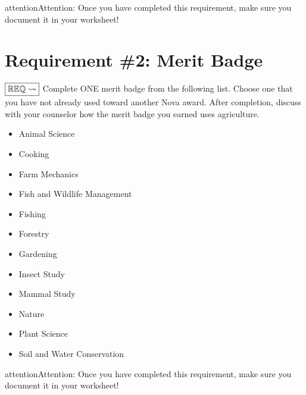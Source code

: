\documentclass[letterpaper,10pt,english,openany,oneside]{sphinxmanual}
\let\sphinxpxdimen\pdfpxdimen\else\newdimen\sphinxpxdimen
\begin{document}
\begin{sphinxadmonition}{attention}{Attention:}
Once you have completed this requirement, make sure you document it in your worksheet!
\end{sphinxadmonition}


\chapter{Requirement \#2: Merit Badge}
\label{\detokenize{requirement2:requirement-2-merit-badge}}\label{\detokenize{requirement2::doc}}
\(\boxed{\mathbb{REQ}\Large \rightsquigarrow}\) Complete ONE merit badge from the following list. Choose one that you have not already used toward another Nova award.
After completion, discuss with your counselor how the merit badge you earned uses agriculture.
\begin{itemize}
\item {} 
Animal Science

\item {} 
Cooking

\item {} 
Farm Mechanics

\item {} 
Fish and Wildlife Management

\item {} 
Fishing

\item {} 
Forestry

\item {} 
Gardening

\item {} 
Insect Study

\item {} 
Mammal Study

\item {} 
Nature

\item {} 
Plant Science

\item {} 
Soil and Water Conservation

\end{itemize}

\begin{figure}[htbp]
\centering

\noindent\sphinxincludegraphics[width=700\sphinxpxdimen]{{meritbadges}.png}
\end{figure}

\begin{sphinxadmonition}{attention}{Attention:}
Once you have completed this requirement, make sure you document it in your worksheet!
\end{sphinxadmonition}
\end{document}
